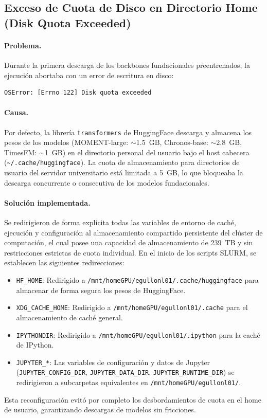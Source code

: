 \documentclass[12pt, a4paper]{article}
\newcommand{\code}[1]{\texttt{#1}}
\begin{document}
\subsection{Exceso de Cuota de Disco en Directorio Home (Disk Quota Exceeded)}
\label{sec:problemas_cuota}

\paragraph{Problema.}
Durante la primera descarga de los backbones fundacionales preentrenados, la ejecución abortaba con un error de escritura en disco:
\begin{verbatim}
OSError: [Errno 122] Disk quota exceeded
\end{verbatim}

\paragraph{Causa.}
Por defecto, la librería \code{transformers} de HuggingFace descarga y almacena los pesos de los modelos (MOMENT-large: $\sim$1.5~GB, Chronos-base: $\sim$2.8~GB, TimesFM: $\sim$1~GB) en el directorio personal del usuario bajo el host cabecera (\code{\textasciitilde{}/.cache/huggingface}). La cuota de almacenamiento para directorios de usuario del servidor universitario está limitada a 5~GB, lo que bloqueaba la descarga concurrente o consecutiva de los modelos fundacionales.

\paragraph{Solución implementada.}
Se redirigieron de forma explícita todas las variables de entorno de caché, ejecución y configuración al almacenamiento compartido persistente del clúster de computación, el cual posee una capacidad de almacenamiento de 239~TB y sin restricciones estrictas de cuota individual. En el inicio de los scripts SLURM, se establecen las siguientes redirecciones:
\begin{itemize}
    \item \code{HF\_HOME}: Redirigido a \code{/mnt/homeGPU/egullonl01/.cache/huggingface} para almacenar de forma segura los pesos de HuggingFace.
    \item \code{XDG\_CACHE\_HOME}: Redirigido a \code{/mnt/homeGPU/egullonl01/.cache} para el almacenamiento de caché general.
    \item \code{IPYTHONDIR}: Redirigido a \code{/mnt/homeGPU/egullonl01/.ipython} para la caché de IPython.
    \item \code{JUPYTER\_*}: Las variables de configuración y datos de Jupyter (\code{JUPYTER\_CONFIG\_DIR}, \code{JUPYTER\_DATA\_DIR}, \code{JUPYTER\_RUNTIME\_DIR}) se redirigieron a subcarpetas equivalentes en \code{/mnt/homeGPU/egullonl01/}.
\end{itemize}
Esta reconfiguración evitó por completo los desbordamientos de cuota en el home de usuario, garantizando descargas de modelos sin fricciones.
\end{document}
